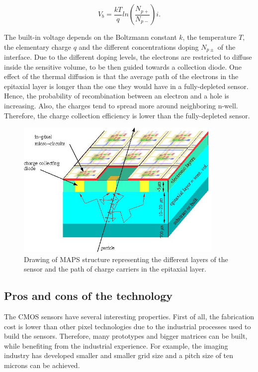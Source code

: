     \begin{equation}
      V_b = \frac{kT}{q}ln\left( \frac{N_{p+}}{N_{p-}}\right)i.
    \end{equation}
    
    The built-in voltage depends on the Boltzmann constant $k$, the temperature $T$, the elementary charge $q$ and the different concentrations doping $N_{p\pm}$ of the interface.
    Due to the different doping levels, the electrons are restricted to diffuse inside the sensitive volume, to be then guided towards a collection diode.
    One effect of the thermal diffusion is that the average path of the electrons in the epitaxial layer is longer than the one they would have in a fully-depleted sensor.
    Hence, the probability of recombination between an electron and a hole is increasing.
    Also, the charges tend to spread more around neighboring n-well.
    Therefore, the charge collection efficiency is lower than the fully-depleted sensor.

    \begin{figure}[!h]
      \centering
      \includegraphics[width = 10cm]{Pictures/vxd/principeMapsMIP.jpg}
      \caption{Drawing of MAPS structure representing the different layers of the sensor and the path of charge carriers in the epitaxial layer.}
      \label{fig:principleMaps}
    \end{figure}

    \subsection{Pros and cons of the technology}

    The \gls{CMOS} sensors have several interesting properties.
    First of all, the fabrication cost is lower than other pixel technologies due to the industrial processes used to build the sensors.
    Therefore, many prototypes and bigger matrices can be built, while benefiting from the industrial experience.
    For example, the imaging industry has developed smaller and smaller grid size and a pitch size of ten microns can be achieved.
    
